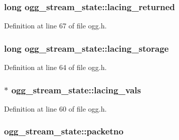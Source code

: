 \subsubsection[{\texorpdfstring{lacing\+\_\+returned}{lacing_returned}}]{\setlength{\rightskip}{0pt plus 5cm}long ogg\+\_\+stream\+\_\+state\+::lacing\+\_\+returned}\hypertarget{structogg__stream__state_a541d66311781b45cf37d87107d515602}{}\label{structogg__stream__state_a541d66311781b45cf37d87107d515602}


Definition at line 67 of file ogg.\+h.

\subsubsection[{\texorpdfstring{lacing\+\_\+storage}{lacing_storage}}]{\setlength{\rightskip}{0pt plus 5cm}long ogg\+\_\+stream\+\_\+state\+::lacing\+\_\+storage}\hypertarget{structogg__stream__state_a23844488216514760bc66b38dfd6d4ae}{}\label{structogg__stream__state_a23844488216514760bc66b38dfd6d4ae}


Definition at line 64 of file ogg.\+h.

\subsubsection[{\texorpdfstring{lacing\+\_\+vals}{lacing_vals}}]{$\ast$ ogg\+\_\+stream\+\_\+state\+::lacing\+\_\+vals}\hypertarget{structogg__stream__state_a55f3febfdfa9600b66fa2a990297813e}{}\label{structogg__stream__state_a55f3febfdfa9600b66fa2a990297813e}


Definition at line 60 of file ogg.\+h.

\subsubsection[{\texorpdfstring{packetno}{packetno}}]{ ogg\+\_\+stream\+\_\+state\+::packetno}\hypertarget{structogg__stream__state_a1bebf380025b6ca0841497e7ab2b5c34}{}\label{structogg__stream__state_a1bebf380025b6ca0841497e7ab2b5c34}


